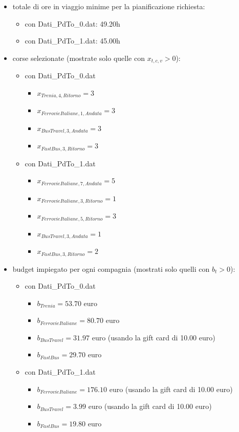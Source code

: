 \documentclass[main.tex]{subfiles}
\begin{document}
\begin{itemize}
    \item totale di ore in viaggio minime per la pianificazione richiesta:
    \begin{itemize}
        \item con Dati\_PdTo\_0.dat: 49.20h
        \item con Dati\_PdTo\_1.dat: 45.00h
    \end{itemize}
    \item corse selezionate (mostrate solo quelle con $x_{t,c,v} > 0$):
    \begin{itemize}
        \item con Dati\_PdTo\_0.dat
        \begin{itemize}
            \item $x_{Trenia,4,Ritorno} = 3$
            \item $x_{FerrovieItaliane,1,Andata} = 3$
            \item $x_{BusTravel,3,Andata} = 3$
            \item $x_{FastBus,3,Ritorno} = 3$
        \end{itemize}
        \item con Dati\_PdTo\_1.dat
        \begin{itemize}
            \item $x_{FerrovieItaliane,7,Andata} = 5$
            \item $x_{FerrovieItaliane,3,Ritorno} = 1$
            \item $x_{FerrovieItaliane,5,Ritorno} = 3$
            \item $x_{BusTravel,3,Andata} = 1$
            \item $x_{FastBus,3,Ritorno} = 2$
        \end{itemize}
    \end{itemize}
    \item budget impiegato per ogni compagnia (mostrati solo quelli con $b_t > 0$):
    \begin{itemize}
        \item con Dati\_PdTo\_0.dat
        \begin{itemize}
            \item $b_{Trenia} = 53.70$ euro
            \item $b_{FerrovieItaliane} = 80.70$ euro
            \item $b_{BusTravel} = 31.97$ euro (usando la gift card di 10.00 euro)
            \item $b_{FastBus} = 29.70$ euro
        \end{itemize}
        \item con Dati\_PdTo\_1.dat
        \begin{itemize}
            \item $b_{FerrovieItaliane} = 176.10$ euro (usando la gift card di 10.00 euro)
            \item $b_{BusTravel} = 3.99$ euro (usando la gift card di 10.00 euro)
            \item $b_{FastBus} = 19.80$ euro
        \end{itemize}
    \end{itemize}
\end{itemize}
\end{document}
